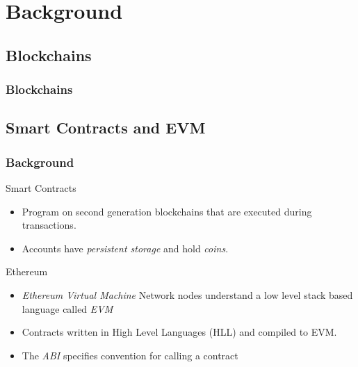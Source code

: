 \documentclass{beamer}
\begin{document}
\section{Background}
\subsection{Blockchains}
\begin{frame}[fragile]
    \frametitle{Blockchains}
  \begin{figure}
    \centering
    \begin{tikzpicture}[shorten >=1pt,on grid, node distance=2.0cm, draw=black!80, auto]
      
    \end{tikzpicture}
  \end{figure}
\end{frame}
\subsection{Smart Contracts and EVM}
\begin{frame}
  \frametitle{Background}
  \begin{block}{Smart Contracts}
    \begin{itemize}
      \item Program on second generation blockchains that are executed
        during transactions.
      \item Accounts have \textit{persistent storage} and hold \textit{coins}.
    \end{itemize}
  \end{block}
  \pause
  \begin{block}{Ethereum}
    \begin{itemize}
      \item \textit{Ethereum Virtual Machine} Network nodes
        understand a low level stack based language called \textit{EVM}
      \item Contracts written in High Level Languages (HLL) and compiled to EVM.
      \item The \textit{ABI} specifies convention for calling a contract
    \end{itemize}
  \end{block}
\end{frame}
\end{document}
